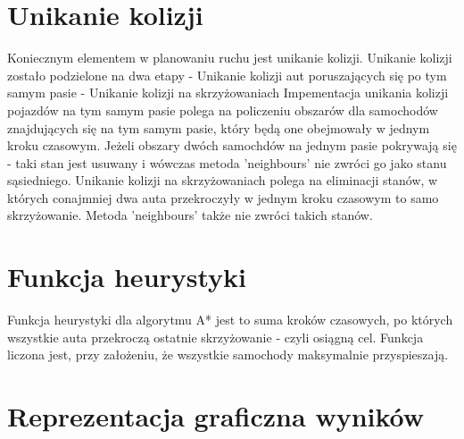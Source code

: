 \section{Unikanie kolizji}

Koniecznym elementem w planowaniu ruchu jest unikanie kolizji.
\newline
\newline
Unikanie kolizji zostało podzielone na dwa etapy
\newline
- Unikanie kolizji aut poruszających się po tym samym pasie
\newline
- Unikanie kolizji na skrzyżowaniach
\newline
\newline
Impementacja unikania kolizji pojazdów na tym samym pasie polega na policzeniu obszarów dla samochodów znajdujących się na tym samym pasie, który będą one obejmowały w jednym kroku czasowym.
\newline
\newline
Jeżeli obszary dwóch samochdów na jednym pasie pokrywają się - taki stan jest usuwany i wówczas metoda 'neighbours' nie zwróci go jako stanu sąsiedniego.
\newline
\newline
Unikanie kolizji na skrzyżowaniach polega na eliminacji stanów, w których conajmniej dwa auta przekroczyły w jednym kroku czasowym to samo skrzyżowanie. Metoda 'neighbours' także nie zwróci takich stanów.

\section{Funkcja heurystyki}

Funkcja heurystyki dla algorytmu A* jest to suma kroków czasowych, po których wszystkie auta przekroczą ostatnie skrzyżowanie - czyli osiągną cel. Funkcja liczona jest, przy założeniu, że wszystkie samochody maksymalnie przyspieszają.

\section{Reprezentacja graficzna wyników}

